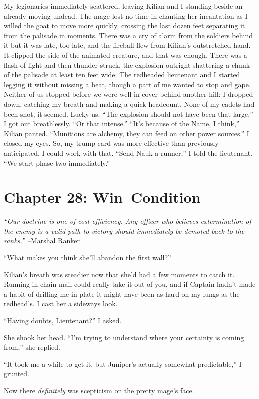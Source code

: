 \documentclass[12pt, openany]{book}
\begin{document}
My legionaries immediately scattered, leaving Kilian and I standing beside an already moving undead. The mage lost no time in chanting her incantation as I willed the goat to move more quickly, crossing the last dozen feet separating it from the palisade in moments. There was a cry of alarm from the soldiers behind it but it was late, too late, and the fireball flew from Kilian’s outstretched hand. It clipped the side of the animated creature, and that was enough. There was a flash of light and then thunder struck, the explosion outright shattering a chunk of the palisade at least ten feet wide. The redheaded lieutenant and I started legging it without missing a beat, though a part of me wanted to stop and gape. Neither of us stopped before we were well in cover behind another hill: I dropped down, catching my breath and making a quick headcount. None of my cadets had been shot, it seemed. Lucky us.
“The explosion should not have been that large,” I got out breathlessly. “Or that intense.”
“It’s because of the Name, I think,” Kilian panted. “Munitions are alchemy, they can feed on other power sources.”
I closed my eyes. So, my trump card was more effective than previously anticipated. I could work with that.
“Send Nauk a runner,” I told the lieutenant. “We start phase two immediately.”
\clearpage
\chapter{Chapter 28: Win Condition}

\textit{“Our doctrine is one of cost-efficiency. Any officer who believes extermination of the enemy is a valid path to victory should immediately be demoted back to the ranks.”
–}Marshal Ranker

“What makes you think she’ll abandon the first wall?”

Kilian’s breath was steadier now that she’d had a few moments to catch it. Running in chain mail could really take it out of you, and if Captain hadn’t made a habit of drilling me in plate it might have been as hard on my lungs as the redhead’s. I cast her a sideways look.

“Having doubts, Lieutenant?” I asked.

She shook her head. “I’m trying to understand where your certainty is coming from,” she replied.

“It took me a while to get it, but Juniper’s actually somewhat predictable,” I grunted.

Now there \textit{definitely} was scepticism on the pretty mage’s face.
\end{document}
